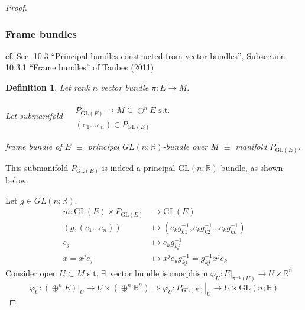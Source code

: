 \documentclass[10pt]{amsart}
\newtheorem{definition}{Definition}
\begin{document}
\begin{multicols*}{2}
\begin{proof}
\subsubsection{Frame bundles}

cf. Sec. 10.3 ``Principal bundles constructed from vector bundles'', Subsection 10.3.1 ``Frame bundles'' of Taubes (2011) \cite{CTaubes2011}

\begin{definition}
Let rank $n$ vector bundle $\pi : E \to M$.  

Let submanifold $\begin{aligned} & \quad \\
  & P_{\text{GL}(E)} \to M \subseteq \oplus^n E \text{ s.t. } \\
  & (e_1 \dots e_n) \in P_{\text{GL}(E)} \end{aligned}$

\emph{frame bundle of $E$} $\equiv$ principal $GL(n;\mathbb{R})$-bundle over $M$ $\equiv $ manifold $P_{\text{GL}(E)}$. 

\end{definition}
This submanifold $P_{\text{GL}(E)}$ is indeed a principal $\text{GL}(n;\mathbb{R})$-bundle, as shown below.

Let $g\in GL(n;\mathbb{R})$.  
\[
\begin{aligned}
 m: \text{GL}(E) \times P_{\text{GL}(E)}  & \to \text{GL}(E) \\ 
(g, (e_1 \dots e_n)) & \mapsto (e_k g_{k1}^{-1}, e_k g_{k2}^{-1} \dots e_k g_{kn}^{-1} ) \\ 
e_j & \mapsto e_k g_{kj}^{-1} \\ 
x = x^j e_j & \mapsto x^j e_k g_{kj}^{-1} = g_{kj}^{-1}x^j e_k
\end{aligned}
\]
Consider open $U \subset M$ s.t. $\exists \, $ vector bundle isomorphism $\varphi_U : \left. E \right|_{\pi^{-1}(U)} \to U \times \mathbb{R}^n$
\[
\varphi_U : \left. ( \oplus^n E ) \right|_U \to U \times ( \oplus^n \mathbb{R}^n) \Longrightarrow \varphi_U : \left. P_{\text{GL}(E)} \right|_U \to U \times \text{GL}(n;\mathbb{R})
\]

\end{proof}


\end{multicols*}
\end{document}
